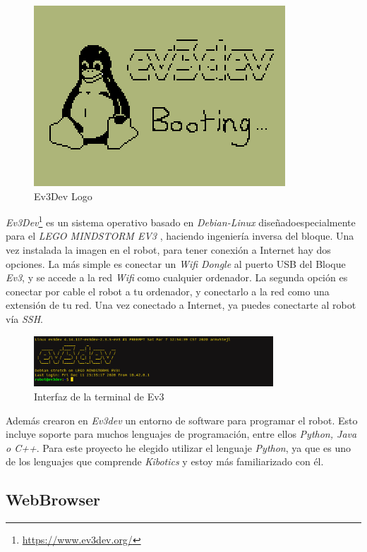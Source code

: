 \begin{figure}
    \centering
    \includegraphics[width=0.6\linewidth]{img/logo_ev3dev_mono.png}
    \caption{Ev3Dev Logo}
    \label{fig:ev3dev}
\end{figure}

\textit{Ev3Dev}\footnote{\url{https://www.ev3dev.org/}} es un sistema operativo basado en \textit{Debian-Linux} diseñadoespecialmente para el \textit{LEGO MINDSTORM EV3} , haciendo ingeniería inversa del bloque.\newline
Una vez instalada la imagen en el robot, para tener conexión a Internet hay dos opciones. La más simple es conectar un \textit{Wifi Dongle} al puerto USB del Bloque \textit{Ev3}, y se accede a la red \textit{Wifi} como cualquier ordenador. La segunda opción es conectar por cable el robot a tu ordenador, y conectarlo a la red como una extensión de tu red.\newline
Una vez conectado a Internet, ya puedes conectarte al robot vía \textit{SSH}.

\begin{figure}[h!]
  \centering
    \includegraphics[width=0.8\textwidth]{img/ev3dev.png}
  \caption{Interfaz de la terminal de Ev3}
  \label{Diseño hardware del Ev3}
\end{figure}
Además crearon en \textit{Ev3dev} un entorno de software para programar el robot. Esto incluye soporte para muchos lenguajes de programación, entre ellos \textit{Python, Java o C++}. Para este proyecto he elegido utilizar el lenguaje \textit{Python}, ya que es uno de los lenguajes que comprende \textit{Kibotics} y estoy más familiarizado con él. 

\subsection{WebBrowser}

